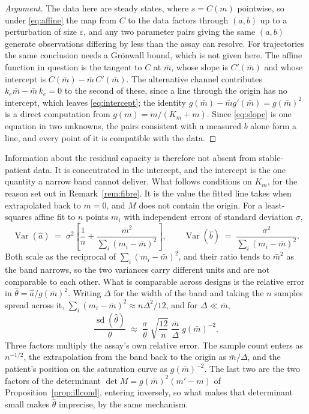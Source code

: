 \begin{proof}[Argument]
The data here are steady states, where $s = C(m)$ pointwise, so under \eqref{eq:affine}
the map from $C$ to the data factors through $(a,b)$ up to a perturbation of size
$\varepsilon$, and any two parameter pairs giving the same $(a,b)$ generate observations
differing by less than the assay can resolve. For trajectories the
same conclusion needs a Gr\"onwall bound, which is not given here. The affine function in
question is the tangent to $C$ at $\bar m$, whose slope is $C'(\bar m)$ and whose intercept
is $C(\bar m) - \bar m\, C'(\bar m)$. The alternative channel contributes $k_e \bar m -
\bar m\, k_e = 0$ to the second of these, since a line through the origin has no intercept,
which leaves \eqref{eq:intercept}; the identity $g(\bar m) - \bar m g'(\bar m) = g(\bar m)^2$
is a direct computation from $g(m) = m/(K_m + m)$. Since \eqref{eq:slope} is one equation in
two unknowns, the pairs consistent with a measured $b$ alone form a line, and every point of
it is compatible with the data.
\end{proof}

Information about the residual capacity is therefore not absent from stable-patient data.
It is concentrated in the intercept, and the intercept is the one quantity a narrow band
cannot deliver. What follows conditions on $K_m$, for the reason set out in
Remark~\ref{rem:fibre}. It is the value the fitted line takes when extrapolated back to $m = 0$, and
$M$ does not contain the origin. For a least-squares affine fit to $n$ points $m_i$ with
independent errors of standard deviation $\sigma$,
\begin{equation}
\operatorname{Var}(\hat a) \;=\; \sigma^2\!\left[\frac{1}{n} +
\frac{\bar m^2}{\sum_i (m_i - \bar m)^2}\right],
\qquad
\operatorname{Var}(\hat b) \;=\; \frac{\sigma^2}{\sum_i (m_i - \bar m)^2}.
\label{eq:varfit}
\end{equation}
Both scale as the reciprocal of $\sum_i (m_i - \bar m)^2$, and their ratio tends to
$\bar m^2$ as the band narrows, so the two variances carry different units and are not
comparable to each other. What is comparable across designs is the relative error in
$\hat\theta = \hat a / g(\bar m)^2$. Writing $\Delta$ for the width of the band and taking
the $n$ samples spread across it, $\sum_i (m_i - \bar m)^2 \approx n\Delta^2/12$, and for
$\Delta \ll \bar m$,
\begin{equation}
\frac{\operatorname{sd}(\hat\theta)}{\theta} \;\approx\;
\frac{\sigma}{\theta}\;\sqrt{\frac{12}{n}}\;\frac{\bar m}{\Delta}\;g(\bar m)^{-2}.
\label{eq:thetaerr}
\end{equation}
Three factors multiply the assay's own relative error. The sample count enters as
$n^{-1/2}$, the extrapolation from the band back to the origin as $\bar m/\Delta$, and the
patient's position on the saturation curve as $g(\bar m)^{-2}$. The last two are the two
factors of the determinant $\det M = g(\bar m)^2 (m' - m)$ of
Proposition~\ref{prop:illcond}, entering inversely, so what makes that determinant small
makes $\hat\theta$ imprecise, by the same mechanism.

